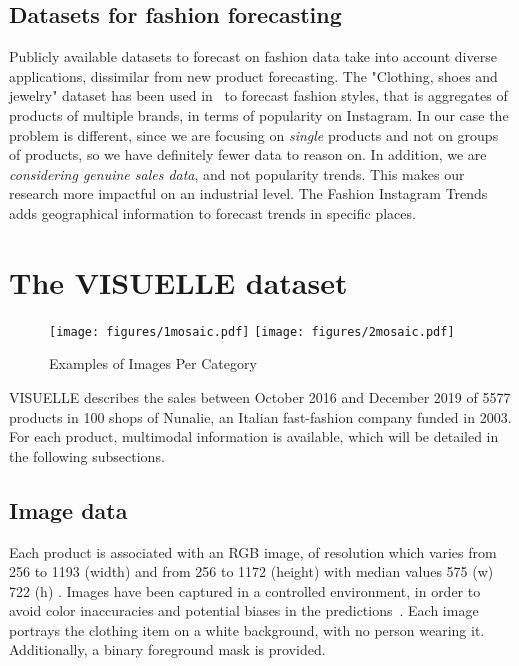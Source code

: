 \documentclass{article}
\newcommand{\datasetname}[0] {VISUELLE}
\begin{document}
    
\subsection{Datasets for fashion forecasting}
Publicly available datasets to forecast on fashion data take into account diverse applications, dissimilar from new product forecasting.  The "Clothing, shoes and jewelry" dataset has been used in~\cite{ni-etal-2019-justifying,al-halah_fashion_2020} to forecast fashion styles, that is aggregates of products of multiple brands, in terms of popularity on Instagram. In our case the problem is different, since we are focusing on \emph{single} products and not on groups of products, so we have definitely fewer data to reason on. In addition, we are \emph{considering genuine sales data}, and not popularity trends. This makes our research more impactful on an industrial level. The Fashion Instagram Trends\cite{ma_knowledge_2020} adds geographical information to forecast trends in specific places.
%
 
\section{The VISUELLE dataset}\label{sec:dataset}
\begin{figure*}[t]
        \texttt{[image: figures/1mosaic.pdf]}
        \texttt{[image: figures/2mosaic.pdf]}
        \caption{Examples of Images Per Category}
        \label{fig:mosaic}
    \end{figure*}

    
\datasetname{} describes the sales between October 2016 and December 2019 of 5577 products in 100 shops of Nunalie, an Italian fast-fashion company funded in 2003. For each product, multimodal information is available, which will be detailed in the following subsections.

\subsection{Image data} Each product is associated with an RGB image, of resolution which varies from 256 to 1193 (width) and from 256 to 1172 (height) with median values 575 (w) 722 (h) . Images have been captured in a controlled environment, in order to avoid color inaccuracies and potential biases in the predictions~\cite{nitse2004impact}. Each image portrays the clothing item on a white background, with no person wearing it. Additionally, a binary foreground mask is provided.
\end{document}
